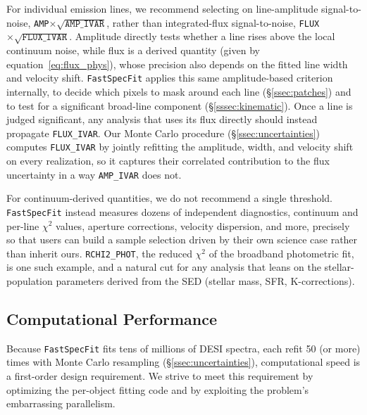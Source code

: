 \documentclass[modern,linenumbers]{aastex701}
\newcommand{\fastspecfit}{\texttt{FastSpecFit}}
\begin{document}
For individual emission lines, we recommend selecting on
line-amplitude signal-to-noise,
\texttt{AMP}$\times\sqrt{\texttt{AMP\_IVAR}}$, rather than
integrated-flux signal-to-noise,
\texttt{FLUX}$\times\sqrt{\texttt{FLUX\_IVAR}}$. Amplitude directly
tests whether a line rises above the local continuum noise, while flux
is a derived quantity (given by equation~\ref{eq:flux_phys}), whose
precision also depends on the fitted line width and velocity
shift. \fastspecfit{} applies this same amplitude-based criterion
internally, to decide which pixels to mask around each line
(\S\ref{ssec:patches}) and to test for a significant broad-line
component (\S\ref{sssec:kinematic}). Once a line is judged
significant, any analysis that uses its flux directly should instead
propagate \texttt{FLUX\_IVAR}. Our Monte Carlo procedure
(\S\ref{ssec:uncertainties}) computes \texttt{FLUX\_IVAR} by jointly
refitting the amplitude, width, and velocity shift on every
realization, so it captures their correlated contribution to the flux
uncertainty in a way \texttt{AMP\_IVAR} does not.

For continuum-derived quantities, we do not recommend a single
threshold. \fastspecfit{} instead measures dozens of independent
diagnostics, continuum and per-line $\chi^2$ values, aperture
corrections, velocity dispersion, and more, precisely so that users
can build a sample selection driven by their own science case rather
than inherit ours. \texttt{RCHI2\_PHOT}, the reduced $\chi^2$ of the
broadband photometric fit, is one such example, and a natural cut for
any analysis that leans on the stellar-population parameters derived
from the SED (stellar mass, SFR, K-corrections).

\subsection{Computational Performance}
\label{ssec:performance}

Because \fastspecfit{} fits tens of millions of DESI spectra, each
refit 50 (or more) times with Monte Carlo resampling
(\S\ref{ssec:uncertainties}), computational speed is a first-order
design requirement. We strive to meet this requirement by optimizing
the per-object fitting code and by exploiting the problem's
embarrassing parallelism.
\end{document}
